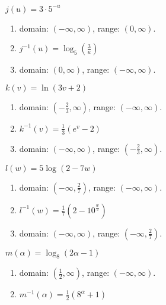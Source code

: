 \begin{exercises}
\begin{problem}
\begin{multicols}{4}
\begin{subproblem}
	\end{subproblem}
	\begin{subproblem}
		$j(u)=3\cdot 5^{-u}$ 
		\begin{shortsolution}
			\begin{enumerate}
				\item domain: $(-\infty,\infty)$, range: $(0,\infty)$.
				\item $j^{-1}(u)=\log_5\left( \frac{3}{u} \right)$ 
				\item domain: $(0,\infty)$, range: $(-\infty,\infty)$.
			\end{enumerate}
		\end{shortsolution}
	\end{subproblem}
	\begin{subproblem}
		$k(v)=\ln(3v+2)$ 
		\begin{shortsolution}
			\begin{enumerate}
				\item domain: $\left( -\frac{2}{3},\infty \right)$, range: $(-\infty,\infty)$.
				\item $k^{-1}(v)=\frac{1}{3}(e^v-2)$ 
				\item domain: $(-\infty,\infty)$, range: $\left( -\frac{2}{3},\infty \right)$.
			\end{enumerate}
		\end{shortsolution}
	\end{subproblem}
	\begin{subproblem}
		$l(w)=5\log(2-7w)$ 
		\begin{shortsolution}
			\begin{enumerate}
				\item domain: $\left( -\infty,\frac{2}{7} \right)$, range: $(-\infty,\infty)$.
				\item $l^{-1}(w)=\frac{1}{7}\left(2-10^{\frac{w}{5}}\right)$ 
				\item domain: $(-\infty,\infty)$, range: $\left( -\infty,\frac{2}{7} \right)$.
			\end{enumerate}
		\end{shortsolution}
	\end{subproblem}
	\begin{subproblem}
		$m(\alpha)=\log_8(2\alpha-1)$ 
		\begin{shortsolution}
			\begin{enumerate}
				\item domain: $\left( \frac{1}{2},\infty \right)$, range: $(-\infty,\infty)$.
				\item $m^{-1}(\alpha)=\frac{1}{2}\left( 8^\alpha+1 \right)$ 

\end{enumerate}
\end{shortsolution}
\end{subproblem}
\end{multicols}
\end{problem}
\end{exercises}
